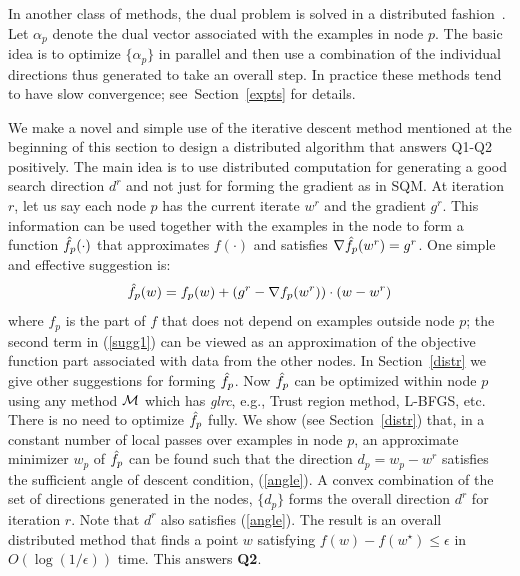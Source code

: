 \documentclass[twoside, 11pt]{article}
\begin{document}
In another class of methods, the dual problem is solved in a distributed fashion~\citep{pechyony2011, yang2013a, yang2013b, jaggi2014}. Let $\alpha_p$ denote the dual vector associated with the examples in node $p$. The basic idea is to optimize $\{\alpha_p\}$ in parallel and then use a combination of the individual directions thus generated to take an overall step. In practice these methods tend to have slow convergence; see~Section~\ref{expts} for details.


We make a novel and simple use of the iterative descent method mentioned at the beginning of this section to design a distributed algorithm that answers Q1-Q2 positively. The main idea is to use distributed computation for generating a good search direction $d^r$ and not just for forming the gradient as in SQM. At iteration $r$, let us say each node $p$ has the current iterate $w^r$ and the gradient $g^r$. This information can be used together with the examples in the node to form a function $\hat{f}_p(\cdot)$ that approximates $f(\cdot)$ and satisfies $\nabla\hat{f}_p(w^r)=g^r$. One simple and effective suggestion is:
\begin{equation}
\hat{f}_p(w)=f_p(w)+(g^r - \nabla f_p(w^r))\cdot(w-w^r)
\label{sugg1}
\end{equation}
where $f_p$ is the part of $f$ that does not depend on examples outside node $p$; the second term in (\ref{sugg1}) can be viewed as an approximation of the objective function part associated with data from the other nodes. In Section~\ref{distr} we give other suggestions for forming $\hat{f}_p$. Now $\hat{f}_p$ can be optimized within node $p$ using any method ${\cal M}$ which has {\it glrc}, e.g., Trust region method, L-BFGS, etc. There is no need to optimize $\hat{f}_p$ fully. We show (see Section~\ref{distr}) that, in a constant number of local passes over examples in node $p$, an approximate minimizer $w_p$ of $\hat{f}_p$ can be found such that the direction $d_p=w_p-w^r$ satisfies the sufficient angle of descent condition, (\ref{angle}). A convex combination of the set of directions generated in the nodes, $\{d_p\}$ forms the overall direction $d^r$ for iteration $r$. Note that $d^r$ also satisfies (\ref{angle}). The result is an overall distributed method that finds a point $w$ satisfying $f(w)-f(w^\star)\le\epsilon$ in $O(\log (1/\epsilon))$ time. This answers {\bf Q2}.
\end{document}
